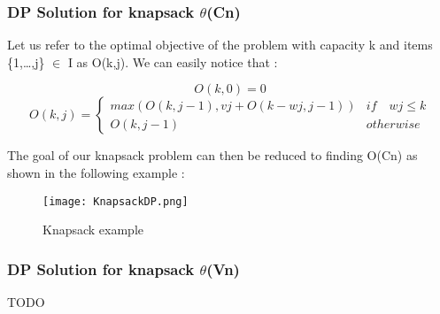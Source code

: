 \subsubsection{DP Solution for knapsack $\theta$(Cn)}

Let us refer to the optimal objective of the problem with capacity k and
items \{1,…,j\} $\in$ I as O(k,j). We can easily notice that :

\[ O(k,0) = 0 \]
\[ O(k,j) = \begin{cases} 
      max(O(k,j-1) , vj +O(k-wj,j-1))& if \quad wj \leq k \\
      O(k,j-1) & otherwise
   \end{cases}
\]

The goal of our knapsack problem can then be reduced to finding O(Cn) as shown in the 
following example :

\begin{figure}[!ht]
    \centering
    \texttt{[image: KnapsackDP.png]}
    \caption{Knapsack example}
    \label{fig:Knapsack_example}
\end{figure}
\FloatBarrier

\subsubsection{DP Solution for knapsack $\theta$(Vn)}

TODO


